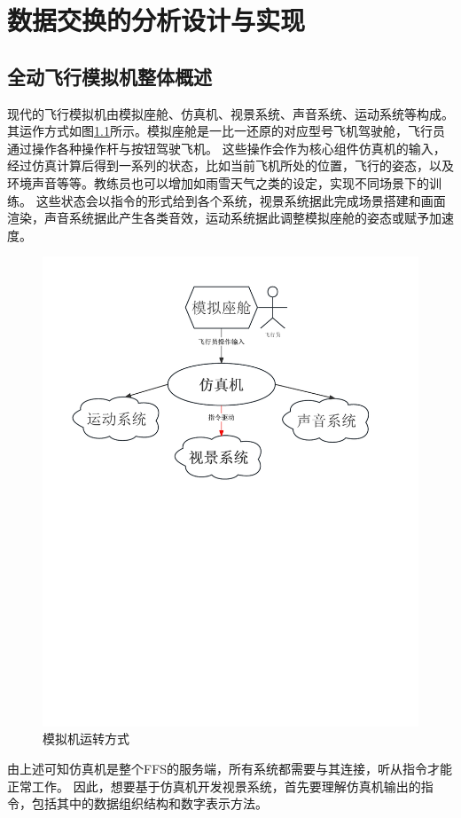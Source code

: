 \chapter{数据交换的分析设计与实现}
\section{全动飞行模拟机整体概述}
现代的飞行模拟机由模拟座舱、仿真机、视景系统、声音系统、运动系统等构成。其运作方式如图\ref{simstruct}所示。模拟座舱是一比一还原的对应型号飞机驾驶舱，飞行员通过操作各种操作杆与按钮驾驶飞机。
这些操作会作为核心组件仿真机的输入，经过仿真计算后得到一系列的状态，比如当前飞机所处的位置，飞行的姿态，以及环境声音等等。教练员也可以增加如雨雪天气之类的设定，实现不同场景下的训练。
这些状态会以指令的形式给到各个系统，视景系统据此完成场景搭建和画面渲染，声音系统据此产生各类音效，运动系统据此调整模拟座舱的姿态或赋予加速度。
\begin{figure}[h]
    \begin{center}
        \includegraphics[width=.9\textwidth]{pictures/simstruct.pdf}
        \caption{模拟机运转方式}
        \label{simstruct}
    \end{center}
\end{figure}
\par
由上述可知仿真机是整个FFS的服务端，所有系统都需要与其连接，听从指令才能正常工作。
因此，想要基于仿真机开发视景系统，首先要理解仿真机输出的指令，包括其中的数据组织结构和数字表示方法。
